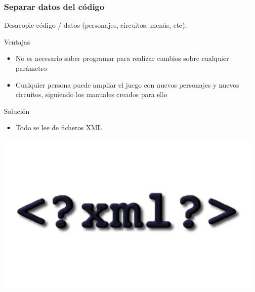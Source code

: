 \begin{frame}
    \frametitle{Separar datos del código}

        Desacople código / datos (personajes, circuitos, menús, etc).\\
        \begin{block}{Ventajas}
            \begin{itemize}
                \item No es necesario saber programar para realizar cambios sobre cualquier parámetro
                \item Cualquier persona puede ampliar el juego con nuevos personajes y nuevos circuitos, siguiendo
                los manuales creados para ello
            \end{itemize}
        \end{block}
        \begin{block}{Solución}
            \begin{itemize}
                \item Todo se lee de ficheros XML
            \end{itemize}
        \end{block}

        \begin{center}
                \includegraphics[scale=0.25]{imagenes/logo_xml.png}
        \end{center}

\end{frame}

